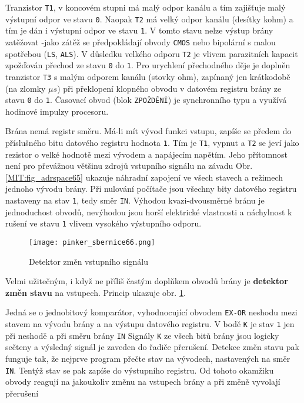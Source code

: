       Tranzistor \texttt{T1}, v koncovém stupni má malý odpor kanálu a tím zajišťuje malý výstupní 
      odpor ve stavu \texttt{0}. Naopak \texttt{T2} má velký odpor kanálu (desítky kohm) a tím je 
      dán i výstupní odpor ve stavu \texttt{1}. V tomto stavu nelze výstup brány zatěžovat -jako 
      zátěž se předpokládají obvody \texttt{CMOS} nebo bipolární s malou spotřebou (\texttt{LS}, 
      \texttt{ALS}). V důsledku velkého odporu \texttt{T2} je vlivem parazitních kapacit zpožďován 
      přechod ze stavu \texttt{0} do \texttt{1}. Pro urychlení přechodného děje je doplněn 
      tranzistor \texttt{T3} s malým odporem kanálu (stovky ohm), zapínaný jen krátkodobě (na 
      zlomky \(\mu s\)) při překlopení klopného obvodu v datovém registru brány ze stavu \texttt{0} 
      do \texttt{1}. Časovací obvod (blok \texttt{ZPOŽDĚNÍ}) je synchronního typu a využívá 
      hodinové impulzy procesoru.
      
      Brána nemá registr směru. Má-li mít vývod funkci vstupu, zapíše se předem do příslušného bitu 
      datového registru hodnota \texttt{1}. Tím je \texttt{T1}, vypnut a \texttt{T2} se jeví jako 
      rezistor o velké hodnotě mezi vývodem a napájecím napětím. Jeho přítomnost není pro převážnou 
      většinu zdrojů vstupního signálu na závadu Obr. \ref{MIT:fig_adrspace65} ukazuje náhradní 
      zapojení ve všech stavech a režimech jednoho vývodu brány. Při nulování počítače jsou všechny 
      bity datového registru nastaveny na stav \texttt{1}, tedy směr \texttt{IN}. Výhodou 
      kvazi-dvousměrné bránu je jednoduchost obvodů, nevýhodou jsou horší elektrické vlastnosti a 
      náchylnost k rušení ve stavu \texttt{1} vlivem vysokého výstupního odporu.
      
    \begin{figure}[ht!] %
      \centering
      \texttt{[image: pinker\_sbernice66.png]}
      \caption{Detektor změn vstupního signálu}
      \label{MIT:fig_sbernice66}
    \end{figure}
    
    Velmi užitečným, i když ne příliš častým doplňkem obvodů brány je \textbf{detektor změn stavu} 
    na vstupech. Princip ukazuje obr. \ref{MIT:fig_sbernice66}.
     
    Jedná se o jednobitový komparátor, vyhodnocující obvodem \texttt{EX-OR} neshodu mezi stavem na 
    vývodu brány a na výstupu datového registru. V bodě \texttt{K} je stav \texttt{1} jen při 
    neshodě a při směru brány \texttt{IN} Signály \texttt{K} ze všech bitů brány jsou logicky 
    sečteny a výsledný signál je zaveden do řadiče přerušení. Detekce změn stavu pak funguje tak, 
    že nejprve program přečte stav na vývodech, nastavených na směr \texttt{IN}. Tentýž stav se pak 
    zapíše do výstupního registru. Od tohoto okamžiku obvody reagují na jakoukoliv změnu na 
    vstupech brány a při změně vyvolají přerušení
    
